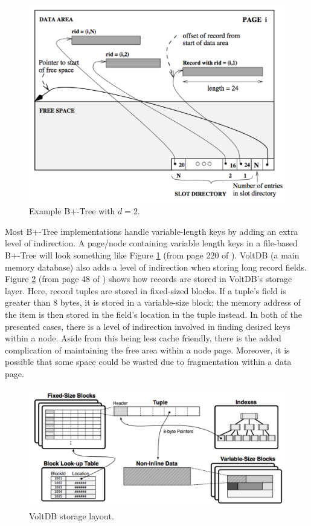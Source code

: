 \begin{figure}[htbp]
    \centering
    \includegraphics[scale=0.4]{figures/pagevariablelengthkeys.png}
    \caption{Example B+-Tree with $d = 2$.}
    \label{fig:exNodePageB+-Tree}
\end{figure}

Most B+-Tree implementations handle variable-length keys by adding an extra level of indirection. A page/node containing variable length keys in a file-based B+-Tree will look something like Figure \ref{fig:exNodePageB+-Tree} (from page 220 of \cite{ramakrishnan2000database}). VoltDB (a main memory database) also adds a level of indirection when storing long record fields. Figure \ref{fig:voltDBStructure} (from page 48 of \cite{main-mem-dbs}) shows how records are stored in VoltDB's storage layer. Here, record tuples are stored in fixed-sized blocks. If a tuple's field is greater than 8 bytes, it is stored in a variable-size block; the memory address of the item is then stored in the field's location in the tuple instead. In both of the presented cases,  there is a level of indirection involved in finding desired keys within a node. Aside from this being less cache friendly, there is the added complication of maintaining the free area within a node page. Moreover, it is possible that some space could be wasted due to fragmentation within a data page.


\begin{figure}[hbtp]
    \centering
    \includegraphics[scale=0.4]{figures/voltdbvariablelengthkey.png}
    \caption{VoltDB storage layout.}
    \label{fig:voltDBStructure}
\end{figure}

